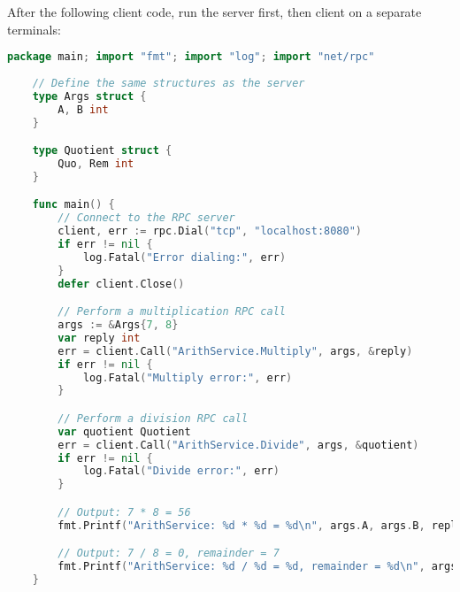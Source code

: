 \newpage 

\begin{Example}

    After the following client code, run the server first, then client on a separate terminals:
    \begin{lstlisting}[language=Go, numbers=none]
    package main; import "fmt"; import "log"; import "net/rpc"
    
    // Define the same structures as the server
    type Args struct {
        A, B int
    }

    type Quotient struct {
        Quo, Rem int
    }

    func main() {
        // Connect to the RPC server
        client, err := rpc.Dial("tcp", "localhost:8080")
        if err != nil {
            log.Fatal("Error dialing:", err)
        }
        defer client.Close()

        // Perform a multiplication RPC call
        args := &Args{7, 8}
        var reply int
        err = client.Call("ArithService.Multiply", args, &reply)
        if err != nil {
            log.Fatal("Multiply error:", err)
        }

        // Perform a division RPC call
        var quotient Quotient
        err = client.Call("ArithService.Divide", args, &quotient)
        if err != nil {
            log.Fatal("Divide error:", err)
        }

        // Output: 7 * 8 = 56
        fmt.Printf("ArithService: %d * %d = %d\n", args.A, args.B, reply)

        // Output: 7 / 8 = 0, remainder = 7
        fmt.Printf("ArithService: %d / %d = %d, remainder = %d\n", args.A, args.B, quotient.Quo, quotient.Rem)
    }
    \end{lstlisting}
    \end{Example}
